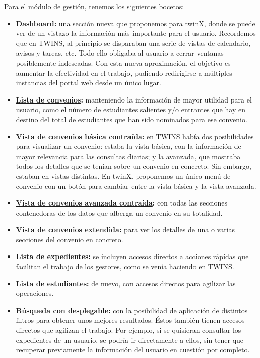 Para el módulo de gestión, tenemos los siguientes bocetos:

\begin{itemize}
	\item \textbf{\hyperref[fig:dashboardWF]{Dashboard}:} una sección nueva que proponemos para twinX, donde se puede ver de un vistazo la información más importante para el usuario. Recordemos que en TWINS, al principio se disparaban una serie de vistas de calendario, avisos y tareas, etc. Todo ello obligaba al usuario a cerrar ventanas posiblemente indeseadas. Con esta nueva aproximación, el objetivo es aumentar la efectividad en el trabajo, pudiendo redirigirse a múltiples instancias del portal web desde un único lugar.
	\item \textbf{\hyperref[fig:convenios_listaWF]{Lista de convenios}:} manteniendo la información de mayor utilidad para el usuario, como el número de estudiantes salientes y/o entrantes que hay en destino del total de estudiantes que han sido nominados para ese convenio.
	\item \textbf{\hyperref[fig:vista_conv_basica_contWF]{Vista de convenios básica contraída}:} en TWINS había dos posibilidades para visualizar un convenio: estaba la vista básica, con la información de mayor relevancia para las consultas diarias; y la avanzada, que mostraba todos los detalles que se tenían sobre un convenio en concreto. Sin embargo, estaban en vistas distintas. En twinX, proponemos un único menú de convenio con un botón para cambiar entre la vista básica y la vista avanzada.
	\item \textbf{\hyperref[fig:vista_conv_avanzada_contWF]{Vista de convenios avanzada contraída}:} con todas las secciones contenedoras de los datos que alberga un convenio en su totalidad.
	\item \textbf{\hyperref[fig:vista_conv_extendidaWF]{Vista de convenios extendida}:} para ver los detalles de una o varias secciones del convenio en concreto.
	\item \textbf{\hyperref[fig:expedientes_listaWF]{Lista de expedientes}:} se incluyen accesos directos a acciones rápidas que facilitan el trabajo de los gestores, como se venía haciendo en TWINS.
	\item \textbf{\hyperref[fig:estudiantes_listaWF]{Lista de estudiantes}:} de nuevo, con accesos directos para agilizar las operaciones.
	\item \textbf{\hyperref[fig:busquedaWF]{Búsqueda con desplegable}:} con la posibilidad de aplicación de distintos filtros para obtener unos mejores resultados. Éstos también tienen accesos directos que agilizan el trabajo. Por ejemplo, si se quisieran consultar los expedientes de un usuario, se podría ir directamente a ellos, sin tener que recuperar previamente la información del usuario en cuestión por completo.

\end{itemize}
